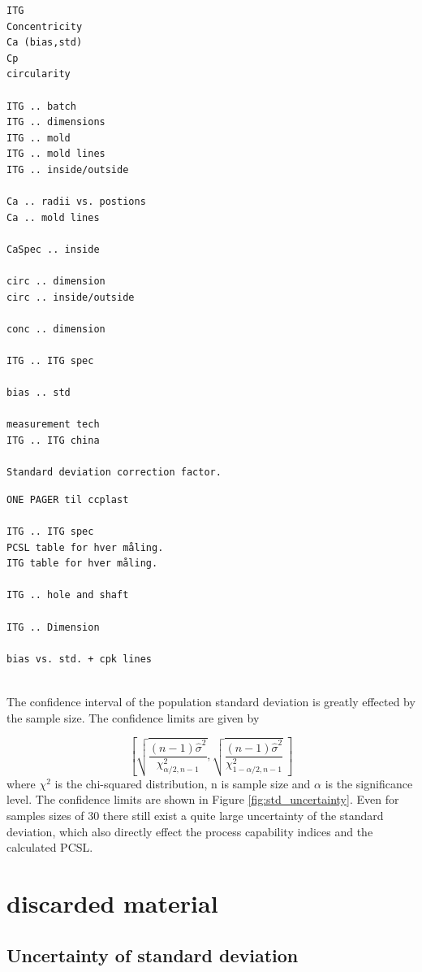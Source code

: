 \documentclass[aip,amsmath, reprint, author-year,nobalancelastpage]{revtex4-1}
\begin{document}
\begin{verbatim}
ITG
Concentricity
Ca (bias,std)
Cp
circularity

ITG .. batch
ITG .. dimensions
ITG .. mold
ITG .. mold lines
ITG .. inside/outside

Ca .. radii vs. postions
Ca .. mold lines
 
CaSpec .. inside

circ .. dimension
circ .. inside/outside

conc .. dimension

ITG .. ITG spec

bias .. std

measurement tech
ITG .. ITG china

Standard deviation correction factor.
\end{verbatim}


\begin{verbatim}
ONE PAGER til ccplast

ITG .. ITG spec 
PCSL table for hver måling.
ITG table for hver måling.

ITG .. hole and shaft

ITG .. Dimension

bias vs. std. + cpk lines


\end{verbatim}


The confidence interval of the population standard deviation is greatly effected by the sample size.  The confidence limits are given by

\begin{equation}
\left[ \sqrt{\frac{(n-1) \hat{\sigma}^2 }{\chi^2_{\alpha/2,n-1}}},  \sqrt{\frac{(n-1) \hat{\sigma}^2 }{\chi^2_{1-\alpha/2,n-1}}} \  \right]
\end{equation}
where $\chi^2$ is the chi-squared distribution, n is sample size and $\alpha$ is the significance level. The confidence limits are shown in Figure \ref{fig:std_uncertainty}. Even for samples sizes of 30 there still exist a quite large uncertainty of the standard deviation, which also directly effect the process capability indices and the calculated PCSL. 


\section{discarded material }

\newpage
\subsection{Uncertainty of standard deviation}
\end{document}
